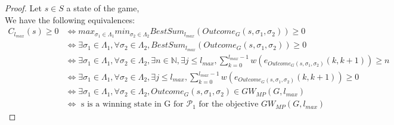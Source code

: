 \documentclass{article}
\newcommand{\IN}{\mathbb{N}}
\theoremstyle{plain}
\begin{document}
\begin{proof}
Let $s \in S$ a state of the game,\\
We have the following equivalences:
\begin{align*}
C_{l_{max}}(s) \geqslant 0 &\Leftrightarrow max_{\sigma_1 \in \Lambda_1} min_{\sigma_2 \in \Lambda_2} BestSum_{l_{max}}(Outcome_G(s, \sigma_1, \sigma_2)) \geqslant 0\\
						   &\Leftrightarrow \exists \sigma_1 \in \Lambda_1, \forall \sigma_2 \in \Lambda_2, BestSum_{l_{max}}(Outcome_G(s, \sigma_1, \sigma_2)) \geqslant 0\\
						   &\Leftrightarrow \exists \sigma_1 \in \Lambda_1, \forall \sigma_2 \in \Lambda_2, \exists n \in \IN, \exists j \leqslant l_{max}, \sum_{k=0}^{l_{max}-1} w(e_{Outcome_G(s, \sigma_1, \sigma_2)} (k, k+1)) \geqslant n\\
						   &\Leftrightarrow \exists \sigma_1 \in \Lambda_1, \forall \sigma_2 \in \Lambda_2, \exists j \leqslant l_{max}, \sum_{k=0}^{l_{max}-1} w(e_{Outcome_G(s, \sigma_1, \sigma_2)} (k, k+1)) \geqslant 0\\
						   &\Leftrightarrow \exists \sigma_1 \in \Lambda_1, \forall \sigma_2 \in \Lambda_2, Outcome_G(s, \sigma_1, \sigma_2) \in GW_{MP}(G, l_{max})\\
						   &\Leftrightarrow \text{ s is a winning state in G for $\mathcal{P}_1$ for the objective } GW_{MP}(G, l_{max})
\end{align*}

\end{proof}
\end{document}
